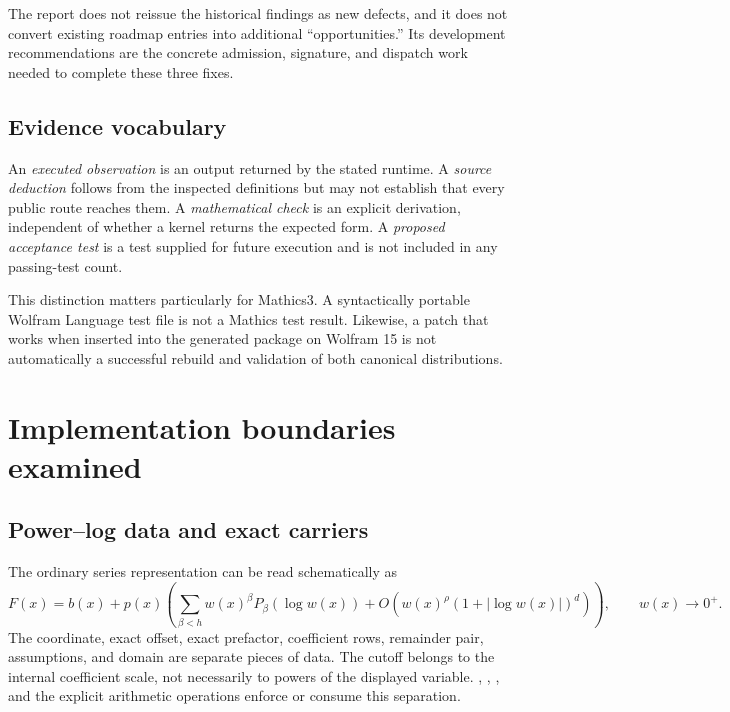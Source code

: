 \documentclass[11pt,letterpaper]{article}
\newcommand{\code}[1]{\texttt{\detokenize{#1}}}
\begin{document}
The report does not reissue the historical findings as new defects, and it does not convert existing roadmap entries into additional ``opportunities.'' Its development recommendations are the concrete admission, signature, and dispatch work needed to complete these three fixes.

\subsection{Evidence vocabulary}

An \emph{executed observation} is an output returned by the stated runtime. A \emph{source deduction} follows from the inspected definitions but may not establish that every public route reaches them. A \emph{mathematical check} is an explicit derivation, independent of whether a kernel returns the expected form. A \emph{proposed acceptance test} is a test supplied for future execution and is not included in any passing-test count.

This distinction matters particularly for Mathics3. A syntactically portable Wolfram Language test file is not a Mathics test result. Likewise, a patch that works when inserted into the generated package on Wolfram 15 is not automatically a successful rebuild and validation of both canonical distributions.

\section{Implementation boundaries examined}
\label{sec:architecture}

\subsection{Power--log data and exact carriers}

The ordinary series representation can be read schematically as
\begin{equation}
 F(x)=b(x)+p(x)\left(\sum_{\beta< h}w(x)^\beta
 P_\beta(\log w(x))+O\!\left(w(x)^\rho
 (1+|\log w(x)|)^d\right)\right),
 \qquad w(x)\longrightarrow0^+.
\label{eq:representation}
\end{equation}
The coordinate, exact offset, exact prefactor, coefficient rows, remainder pair, assumptions, and domain are separate pieces of data. The cutoff belongs to the internal coefficient scale, not necessarily to powers of the displayed variable. \code{seriesData}, \code{seriesFlat}, \code{seriesMake}, and the explicit arithmetic operations enforce or consume this separation.\cite{operations}
\end{document}
